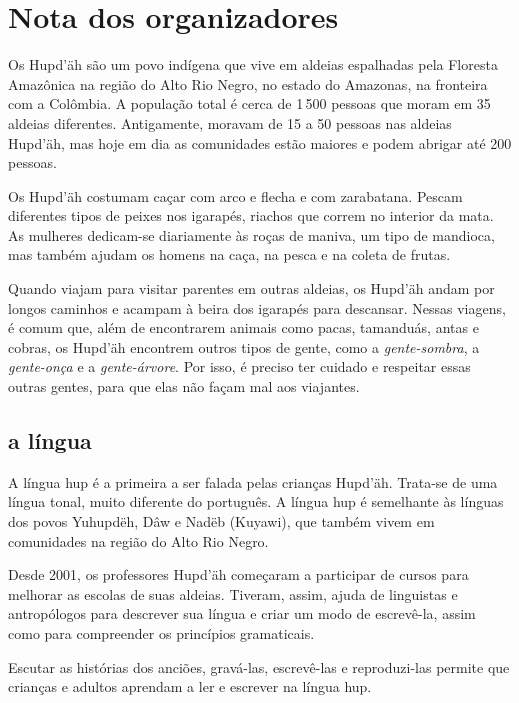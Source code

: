 \chapter{Nota dos organizadores}

Os Hupd’äh são um povo indígena que vive em aldeias espalhadas pela Floresta Amazônica na região do Alto Rio Negro, no estado do Amazonas, na fronteira com a Colômbia. A população total é cerca de 1\,500 pessoas que moram em 35 aldeias diferentes. Antigamente, moravam de 15 a 50 pessoas nas aldeias Hupd’äh, mas hoje em dia as comunidades estão maiores e podem abrigar até 200 pessoas.

Os Hupd’äh costumam caçar com arco e flecha e com zarabatana. Pescam diferentes tipos de peixes nos igarapés, riachos que correm no interior da mata. As mulheres dedicam-se diariamente às roças de maniva, um tipo de mandioca, mas também ajudam os homens na caça, na pesca e na coleta de frutas.

Quando viajam para visitar parentes em outras aldeias, os Hupd’äh andam por longos caminhos e acampam à beira dos igarapés para descansar. Nessas viagens, é comum que, além de encontrarem animais como pacas, tamanduás, antas e cobras, os Hupd’äh encontrem outros tipos de gente, como a \textit{gente-sombra}, a \textit{gente-onça} e a \textit{gente-árvore}. Por isso, é preciso ter cuidado e respeitar essas outras gentes, para que elas não façam mal aos viajantes.

\section{a língua}

A língua hup é a primeira a ser falada pelas crianças Hupd’äh. Trata-se de uma língua tonal, muito
diferente do português. A língua hup é semelhante às línguas dos povos Yuhupdëh,
Dâw e Nadëb (Kuyawi), que também vivem em comunidades na região do Alto Rio Negro.

Desde 2001, os professores Hupd’äh começaram a participar de cursos para melhorar as
escolas de suas aldeias. Tiveram, assim, ajuda de linguistas e antropólogos para descrever sua língua e criar 
um modo de escrevê-la, assim como para compreender os princípios gramaticais.

Escutar as histórias dos anciões, gravá-las, escrevê-las e reproduzi-las permite que
crianças e adultos aprendam a ler e escrever na língua hup.

